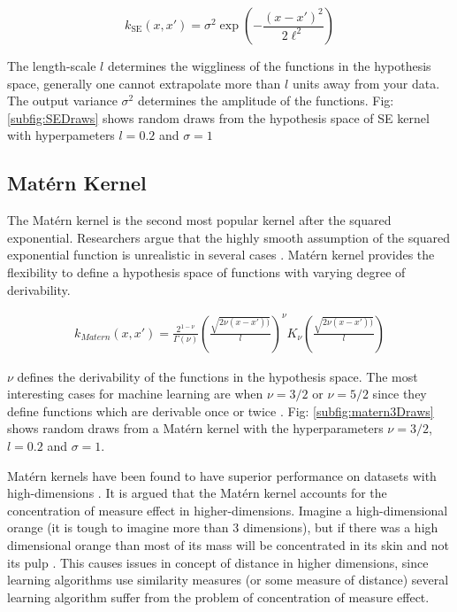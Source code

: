 \begin{equation}
k_{\textrm{SE}}(x, x') = \sigma^2\exp\left(-\frac{(x - x')^2}{2\ell^2}\right)
\end{equation}

The length-scale $l$ determines the wiggliness of the functions in the hypothesis space, generally one cannot extrapolate more than $l$ units away from your data. The output variance $\sigma^{2}$ determines the amplitude of the functions. Fig: \ref{subfig:SEDraws} shows random draws from the hypothesis space of SE kernel with hyperpameters $l = 0.2$  and  $\sigma = 1$

\subsection{Mat\'ern Kernel}\label{subsec:maternKernel}
The Mat\'ern kernel is the second most popular kernel after the squared exponential. Researchers argue that the highly smooth assumption of the squared exponential function is unrealistic in several cases \cite{stein2012interpolation}. Mat\'ern kernel provides the flexibility to define a hypothesis space of functions with varying degree of derivability. 

\begin{align}
k_{Matern}(x, x') = \frac{2^{1- \nu }}{\Gamma (\nu)}\left ( \frac{\sqrt{2\nu(x-x'))}}{l} \right )^{\nu}K_{\nu}\left ( \frac{\sqrt{2\nu(x-x'))}}{l} \right)
\end{align}

$\nu$ defines the derivability of the functions in the hypothesis space. The most interesting cases for machine learning are when $\nu = 3/2$ or $\nu = 5/2$ since they define functions which are derivable once or twice \cite{rasmussen2006gaussian}. Fig: \ref{subfig:matern3Draws} shows random draws from a Mat\'ern kernel with the hyperparameters $\nu = 3/2$, $l = 0.2$ and  $\sigma = 1$. 

Mat\'ern kernels have been found to have superior performance on datasets with high-dimensions \cite{le2013fastfood}. It is argued that the Mat\'ern kernel accounts for the concentration of measure effect in higher-dimensions. Imagine a high-dimensional orange (it is tough to imagine more than 3 dimensions), but if there was a high dimensional orange than most of its mass will be concentrated in its skin and not its pulp \cite{domingos2012few}. This causes issues in concept of distance in higher dimensions, since learning algorithms use similarity measures (or some measure of distance) several learning algorithm suffer from the problem of concentration of measure effect.

